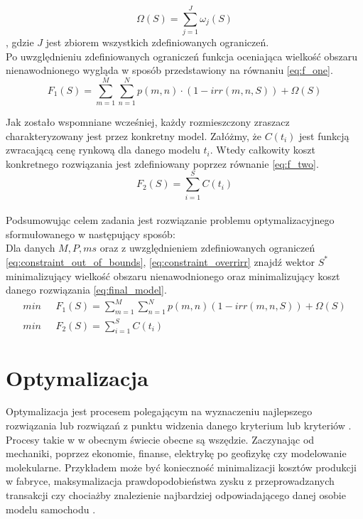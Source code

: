 \documentclass[twoside]{iisthesis}
\begin{document}
\begin{equation}\label{eq:constraint_sum}
	\Omega(S) = \sum_{j = 1}^{J} \omega_{j}(S)
\end{equation}
, gdzie $J$ jest zbiorem wszystkich zdefiniowanych ograniczeń.\\

Po uwzględnieniu zdefiniowanych ograniczeń funkcja oceniająca wielkość obszaru nienawodnionego wygląda w sposób przedstawiony na równaniu \eqref{eq:f_one}.
\begin{equation}\label{eq:f_one}
F_{1}(S) = \sum_{m=1}^{M}\sum_{n=1}^{N} p(m,n) \cdot (1 - irr(m,n,S)) + \Omega(S)
\end{equation}

Jak zostało wspomniane wcześniej, każdy rozmieszczony zraszacz charakteryzowany jest przez konkretny model. Załóżmy, że $C(t_{i})$ jest funkcją zwracającą cenę rynkową dla danego modelu $t_i$. Wtedy całkowity koszt konkretnego rozwiązania jest zdefiniowany poprzez równanie \eqref{eq:f_two}.
\begin{equation}\label{eq:f_two}
	F_{2}(S) = \sum_{i=1}^{S} C(t_{i})
\end{equation}\\

Podsumowując celem zadania jest rozwiązanie problemu optymalizacyjnego sformułowanego w następujący sposób:\\

Dla danych $M, P, ms$ oraz z uwzględnieniem zdefiniowanych ograniczeń \eqref{eq:constraint_out_of_bounds}, \eqref{eq:constraint_overrirr} znajdź wektor $S^{*}$ minimalizujący wielkość obszaru nienawodnionego oraz minimalizujący koszt danego rozwiązania \eqref{eq:final_model}.
\begin{equation}\label{eq:final_model}
	\begin{split}
		min \text{  }&  F_{1}(S) = \sum_{m=1}^{M}\sum_{n=1}^{N} p(m,n) (1 - irr(m,n,S)) + \Omega(S)\\
		min \text{  }&	F_{2}(S) = \sum_{i=1}^{S} C(t_{i})
	\end{split}
\end{equation}

\chapter{Optymalizacja}
Optymalizacja jest procesem polegającym na wyznaczeniu najlepszego rozwiązania lub rozwiązań z punktu widzenia danego kryterium lub kryteriów \cite{wiki_optimization}. Procesy takie w w obecnym świecie obecne są wszędzie. Zaczynając od mechaniki, poprzez ekonomie, finanse, elektrykę po geofizykę czy modelowanie molekularne. Przykładem może być konieczność minimalizacji kosztów produkcji w fabryce, maksymalizacja prawdopodobieństwa zysku z przeprowadzanych transakcji czy chociażby znalezienie najbardziej odpowiadającego danej osobie modelu samochodu \cite{wiki_pl_optimization}.
\end{document}
